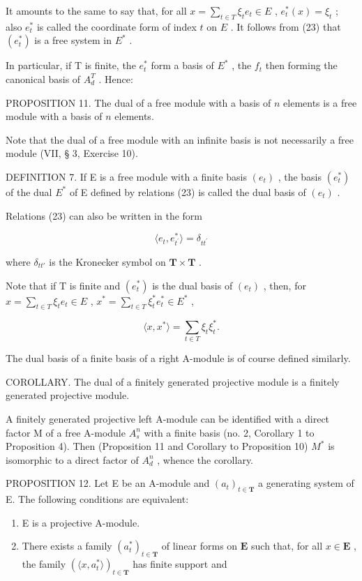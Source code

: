 It amounts to the same to say that, for all \(x = \sum_{t \in T} \xi_t e_t \in E\) , \(e_t^*(x) = \xi_t\) ; also \(e_t^*\) is called the coordinate form of index \(t\) on \(E\) . It follows from (23) that \((e_t^*)\) is a free system in \(E^*\) .

In particular, if T is finite, the \(e_{t}^{*}\) form a basis of \(E^{*}\) , the \(f_{t}\) then forming the canonical basis of \(A_{d}^{T}\) . Hence:

PROPOSITION 11. The dual of a free module with a basis of \(n\) elements is a free module with a basis of \(n\) elements.

Note that the dual of a free module with an infinite basis is not necessarily a free module (VII, § 3, Exercise 10).

DEFINITION 7. If E is a free module with a finite basis \((e_{t})\) , the basis \((e_{t}^{*})\) of the dual \(E^{*}\) of E defined by relations (23) is called the dual basis of \((e_{t})\) .

Relations (23) can also be written in the form

\[
\langle e _ {t}, e _ {t ^ {\prime}} ^ {*} \rangle = \delta_ {t t ^ {\prime}}\tag{24}
\]

where \(\delta_{tt'}\) is the Kronecker symbol on \(\mathbf{T} \times \mathbf{T}\) .

Note that if T is finite and \((e_{t}^{*})\) is the dual basis of \((e_{t})\) , then, for \(x = \sum_{t \in T} \xi_{t} e_{t} \in E\) , \(x^{*} = \sum_{t \in T} \xi_{t}^{*} e_{t}^{*} \in E^{*}\) ,

\[
\langle x, x ^ {*} \rangle = \sum_ {t \in T} \xi_ {t} \xi_ {t} ^ {*}.\tag{25}
\]

The dual basis of a finite basis of a right A-module is of course defined similarly.

COROLLARY. The dual of a finitely generated projective module is a finitely generated projective module.

A finitely generated projective left A-module can be identified with a direct factor M of a free A-module \(A_{s}^{n}\) with a finite basis (no. 2, Corollary 1 to Proposition 4). Then (Proposition 11 and Corollary to Proposition 10) \(M^{*}\) is isomorphic to a direct factor of \(A_{d}^{n}\) , whence the corollary.

PROPOSITION 12. Let E be an A-module and \((a_{t})_{t\in \mathbf{T}}\) a generating system of E. The following conditions are equivalent:

\begin{enumerate}
\def\labelenumi{(\alph{enumi})}
\item
  E is a projective A-module.
\item
  There exists a family \((a_{t}^{*})_{t\in \mathbf{T}}\) of linear forms on \(\mathbf{E}\) such that, for all \(x\in \mathbf{E}\) , the family \((\langle x,a_t^*\rangle)_{t\in \mathbf{T}}\) has finite support and
\end{enumerate}

